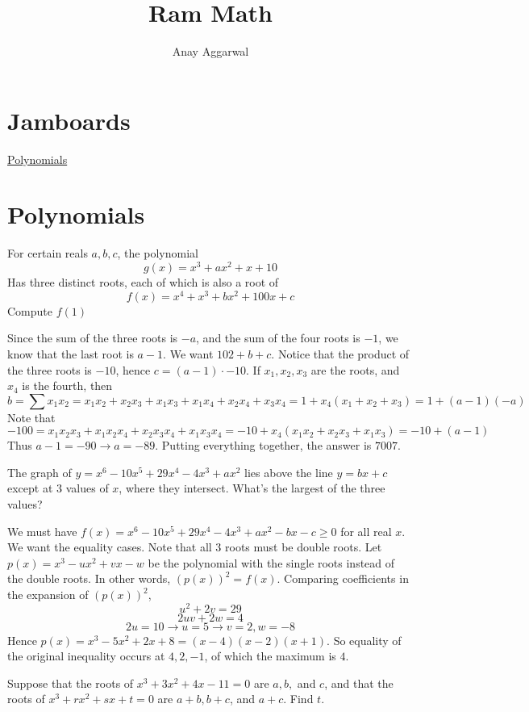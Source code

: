 \documentclass[11pt]{scrartcl}
\title{Ram Math}
\author{Anay Aggarwal}
\begin{document}
\maketitle
\section{Jamboards}
\href{https://jamboard.google.com/d/1GIAwYaI3D2N-1IsQxEpHmhRcS8Xmtpmddfsv4TQs4aI/viewer?f=0}{Polynomials}
\section{Polynomials}
\begin{example}
  [AMC 12 2017]
  For certain reals $a,b,c$, the polynomial
  $$g(x)=x^3+ax^2+x+10$$
  Has three distinct roots, each of which is also a root of
  $$f(x)=x^4+x^3+bx^2+100x+c$$
  Compute $f(1)$
\end{example}
\begin{soln}
  Since the sum of the three roots is $-a$, and the sum of the four roots is $-1$, we know that the last root is $a-1$.
  We want $102+b+c$. Notice that the product of the three roots is $-10$, hence $c=(a-1)\cdot -10$.
  If $x_1, x_2, x_3$ are the roots, and $x_4$ is the fourth, then
  $$b=\sum x_1x_2=x_1x_2+x_2x_3+x_1x_3+x_1x_4+x_2x_4+x_3x_4=1+x_4(x_1+x_2+x_3)=1+(a-1)(-a)$$
  Note that
  $$-100=x_1x_2x_3+x_1x_2x_4+x_2x_3x_4+x_1x_3x_4=-10+x_4(x_1x_2+x_2x_3+x_1x_3)=-10+(a-1)$$
  Thus $a-1=-90\to a=-89$. Putting everything together, the answer is $7007$.
\end{soln}
\begin{example}
  [AMC 12 2010]
  The graph of $y=x^6-10x^5+29x^4-4x^3+ax^2$ lies above the line $y=bx+c$
  except at $3$ values of $x$, where they intersect. What's the largest of
  the three values?
\end{example}
\begin{soln}
  We must have $f(x)=x^6-10x^5+29x^4-4x^3+ax^2-bx-c\ge 0$ for all real $x$. We want the equality cases.
Note that all $3$ roots must be double roots. Let $p(x)=x^3-ux^2+vx-w$ be the polynomial with the single roots instead of the double roots.
In other words, $(p(x))^2=f(x)$. Comparing coefficients in the expansion of $(p(x))^2$,
$$u^2+2v=29$$
$$2uv+2w=4$$
$$2u=10\to u=5\to v=2, w=-8$$
Hence $p(x)=x^3-5x^2+2x+8=(x-4)(x-2)(x+1)$. So equality of the original inequality
occurs at $4,2,-1$, of which the maximum is $4$.
\end{soln}
\begin{example}
  [AIME 1996]
  Suppose that the roots of $x^3+3x^2+4x-11=0$ are $a,b,$ and $c$, and that
  the roots of $x^3+rx^2+sx+t=0$ are $a+b, b+c$, and $a+c$. Find $t$.
\end{example}
\end{document}
